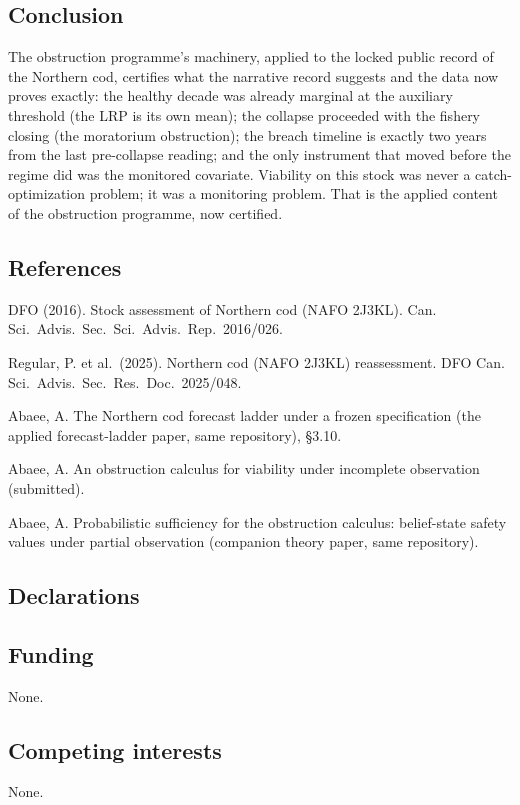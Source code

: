 \documentclass[10pt,twocolumn]{article}
\theoremstyle{plain}
\theoremstyle{remark}
\begin{document}
\subsection{Conclusion}\label{conclusion}

The obstruction programme's machinery, applied to the locked public
record of the Northern cod, certifies what the narrative record
suggests and the data now proves exactly: the healthy decade was
already marginal at the auxiliary threshold (the LRP is its own mean);
the collapse proceeded with the fishery closing (the moratorium
obstruction); the breach timeline is exactly two years from the last
pre-collapse reading; and the only instrument that moved before the
regime did was the monitored covariate. Viability on this stock was
never a catch-optimization problem; it was a monitoring problem. That
is the applied content of the obstruction programme, now certified.

\subsection*{References}

{\footnotesize
DFO (2016). Stock assessment of Northern cod (NAFO 2J3KL). Can. Sci.\ Advis.\ Sec.\ Sci.\ Advis.\ Rep.\ 2016/026.

Regular, P. et al.\ (2025). Northern cod (NAFO 2J3KL) reassessment. DFO Can. Sci.\ Advis.\ Sec.\ Res.\ Doc.\ 2025/048.

Abaee, A. The Northern cod forecast ladder under a frozen specification (the applied forecast-ladder paper, same repository), \S3.10.

Abaee, A. An obstruction calculus for viability under incomplete observation (submitted).

Abaee, A. Probabilistic sufficiency for the obstruction calculus: belief-state safety values under partial observation (companion theory paper, same repository).
}

\subsection*{Declarations}

\subsection*{Funding}
None.

\subsection*{Competing interests}
None.
\end{document}
